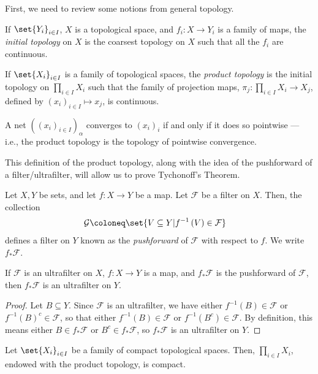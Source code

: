 \documentclass[10pt]{mypackage}
\begin{document}
First, we need to review some notions from general topology.
\begin{definition}
  If $\set{Y_i}_{i\in I}$, $X$ is a topological space, and $f_i\colon X \rightarrow Y_i$ is a family of maps, the \textit{initial topology} on $X$ is the coarsest topology on $X$ such that all the $f_i$ are continuous.
\end{definition}
\begin{definition}
  If $\set{X_i}_{i\in I}$ is a family of topological spaces, the \textit{product topology} is the initial topology on $\prod_{i\in I}X_i$ such that the family of projection maps, $\pi_j\colon \prod_{i\in I}X_i\rightarrow X_j$, defined by $\left( x_i \right)_{i\in I} \mapsto x_j$, is continuous.\newline

  A net $\left( \left( x_{i} \right)_{i\in I} \right)_{\alpha}$ converges to $ \left( x_i \right)_{i}$ if and only if it does so pointwise --- i.e., the product topology is the topology of pointwise convergence. 
\end{definition}
This definition of the product topology, along with the idea of the pushforward of a filter/ultrafilter, will allow us to prove Tychonoff's Theorem.
\begin{definition}
  Let $X,Y$ be sets, and let $f\colon X\rightarrow Y$ be a map. Let $\mathcal{F}$ be a filter on $X$. Then, the collection
  \begin{align*}
    \mathcal{G} &\coloneq \set{V\subseteq Y | f^{-1}\left( V \right) \in \mathcal{F}}
  \end{align*}
  defines a filter on $Y$ known as the \textit{pushforward} of $\mathcal{F}$ with respect to $f$. We write $f_{\ast}\mathcal{F}$.
\end{definition}
\begin{proposition}
  If $\mathcal{F}$ is an ultrafilter on $X$, $f\colon X\rightarrow Y$ is a map, and $f_{\ast}\mathcal{F}$ is the pushforward of $\mathcal{F}$, then $f_{\ast}\mathcal{F}$ is an ultrafilter on $Y$.
\end{proposition}
\begin{proof}
  Let $B\subseteq Y$. Since $\mathcal{F}$ is an ultrafilter, we have either $f^{-1}\left( B \right)\in \mathcal{F}$ or $f^{-1}\left( B \right)^{c}\in \mathcal{F}$, so that either $f^{-1}\left( B \right)\in \mathcal{F}$ or $f^{-1}\left( B^{c} \right)\in \mathcal{F}$. By definition, this means either $B\in f_{\ast}\mathcal{F}$ or $B^{c}\in f_{\ast}\mathcal{F}$, so $f_{\ast}\mathcal{F}$ is an ultrafilter on $Y$.
\end{proof}
\begin{theorem}
  Let $\set{X_i}_{i\in I}$ be a family of compact topological spaces. Then, $\prod_{i\in I}X_i$, endowed with the product topology, is compact.
\end{theorem}
\end{document}
